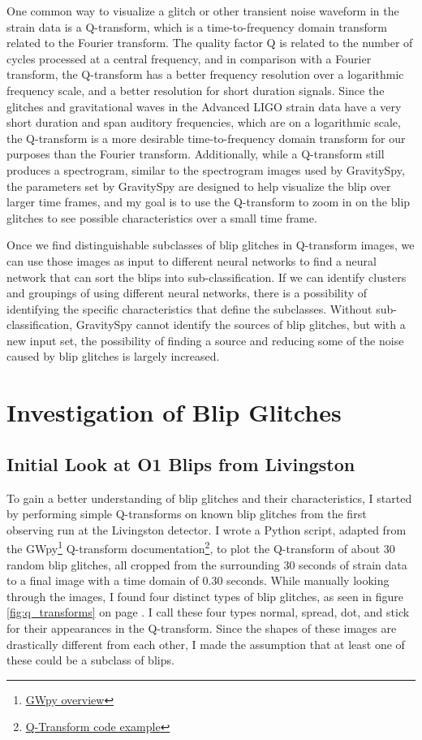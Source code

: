 \documentclass[a4paper]{article}
\begin{document}
One common way to visualize a glitch or other transient noise waveform in the strain data is a Q-transform, which is a time-to-frequency domain transform related to the Fourier transform. The quality factor Q is related to the number of cycles processed at a central frequency, and in comparison with a Fourier transform, the Q-transform has a better frequency resolution over a logarithmic frequency scale, and a better resolution for short duration signals. Since the glitches and gravitational waves in the Advanced LIGO strain data have a very short duration and span auditory frequencies, which are on a logarithmic scale, the Q-transform is a more desirable time-to-frequency domain transform for our purposes than the Fourier transform. Additionally, while a Q-transform still produces a spectrogram, similar to the spectrogram images used by GravitySpy, the parameters set by GravitySpy are designed to help visualize the blip over larger time frames, and my goal is to use the Q-transform to zoom in on the blip glitches to see possible characteristics over a small time frame.

Once we find distinguishable subclasses of blip glitches in Q-transform images, we can use those images as input to different neural networks to find a neural network that can sort the blips into sub-classification. If we can identify clusters and groupings of using different neural networks, there is a possibility of identifying the specific characteristics that define the subclasses. Without sub-classification, GravitySpy cannot identify the sources of blip glitches, but with a new input set, the possibility of finding a source and reducing some of the noise caused by blip glitches is largely increased. 

\section{Investigation of Blip Glitches}

\subsection{Initial Look at O1 Blips from Livingston} \label{investigation}

To gain a better understanding of blip glitches and their characteristics, I started by performing simple Q-transforms on known blip glitches from the first observing run at the Livingston detector. I wrote a Python script, adapted from the GWpy\footnote{\href{https://gwpy.github.io/docs/stable/overview.html}{GWpy overview}} Q-transform documentation\footnote{\href{https://gwpy.github.io/docs/stable/examples/timeseries/qscan.html}{Q-Transform code example}}, to plot the Q-transform of about 30 random blip glitches, all cropped from the surrounding 30 seconds of strain data to a final image with a time domain of 0.30 seconds. While manually looking through the images, I found four distinct types of blip glitches, as seen in figure \ref{fig:q_transforms} on page \pageref{fig:q_transforms}. I call these four types normal, spread, dot, and stick for their appearances in the Q-transform. Since the shapes of these images are drastically different from each other, I made the assumption that at least one of these could be a subclass of blips.
\end{document}
